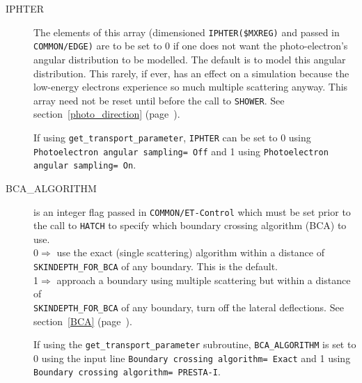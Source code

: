 \begin{description}
\item[IPHTER] The elements of this array (dimensioned {\tt IPHTER(\$MXREG)}
and passed in\\ {\tt COMMON/EDGE)} are to be set to 0 if one does not
want the
photo-electron's angular distribution to be modelled\cite{BR86a}. The
default is to model this angular distribution.  This rarely, if ever,
has an effect on a simulation because the low-energy electrons experience
so much multiple scattering anyway.  This array need not be reset until
before the call to {\tt SHOWER}. See section~\ref{photo_direction}
(page~\pageref{photo_direction}).

If using {\tt get\_transport\_parameter}, {\tt IPHTER} can be set to
0 using {\tt Photoelectron angular sampling= Off} and 1 using
{\tt Photoelectron angular sampling= On}.

\item[BCA\_ALGORITHM] is an integer flag passed  in {\tt COMMON/ET-Control}
which must be set prior to the call to {\tt HATCH} to specify which boundary
crossing algorithm (BCA) to use.\\
0$\Rightarrow$ use the exact (single scattering) algorithm
within a distance of {\tt SKINDEPTH\_FOR\_BCA} of any boundary.
This is the default. \\
1$\Rightarrow$ approach a boundary using multiple scattering but within a
distance of\\ {\tt SKINDEPTH\_FOR\_BCA} of any boundary, turn off the lateral
deflections. See section~\ref{BCA} (page~\pageref{BCA}).

If using the {\tt get\_transport\_parameter} subroutine, {\tt BCA\_ALGORITHM} is
set to 0 using the input line {\tt Boundary crossing algorithm= Exact} and
1 using {\tt Boundary crossing algorithm= PRESTA-I}.


\end{description}

